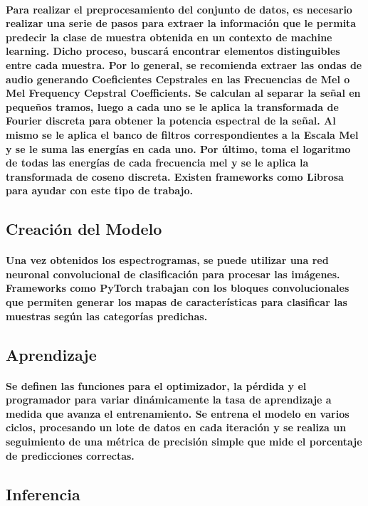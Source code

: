 \documentclass[12pt]{article}
\begin{document}
\paragraph{
Para realizar el preprocesamiento del conjunto de datos, es necesario realizar una serie de pasos para extraer la información que le permita predecir la clase de muestra obtenida en un contexto de machine learning. Dicho proceso, buscará encontrar elementos distinguibles entre cada muestra.
Por lo general, se recomienda extraer las ondas de audio generando Coeﬁcientes Cepstrales en las Frecuencias de Mel o Mel Frequency Cepstral Coeﬃcients. Se calculan al separar la señal en pequeños tramos, luego a cada uno se le aplica la transformada de Fourier discreta para obtener la potencia espectral de la señal. Al mismo se le aplica el banco de filtros correspondientes a la Escala Mel y se le suma las energías en cada uno.
Por último, toma el logaritmo de todas las energías de cada frecuencia mel y se le aplica la transformada de coseno discreta.
Existen frameworks como Librosa para ayudar con este tipo de trabajo.}
\subsection{Creación del Modelo}
\paragraph{
Una vez obtenidos los espectrogramas, se puede utilizar una red neuronal convolucional de clasificación para procesar las imágenes. Frameworks como PyTorch trabajan con los bloques convolucionales que permiten generar los mapas de características para clasificar las muestras según las categorías predichas.}
\subsection{Aprendizaje}
\paragraph{
Se definen las funciones para el optimizador, la pérdida y el programador para variar dinámicamente la tasa de aprendizaje a medida que avanza el entrenamiento.
Se entrena el modelo en varios ciclos, procesando un lote de datos en cada iteración y se realiza un seguimiento de una métrica de precisión simple que mide el porcentaje de predicciones correctas.}
\subsection{Inferencia}
\end{document}
